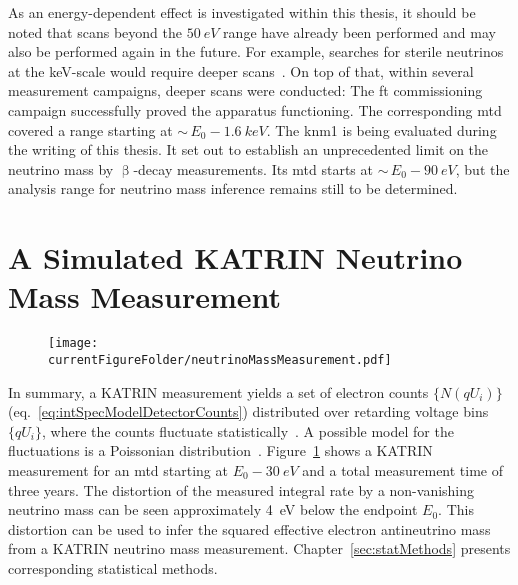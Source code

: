 As an energy-dependent effect is investigated within this thesis, it should be noted that scans beyond the $\SI{50}{eV}$ range have already been performed and may also be performed again in the future. For example, searches for sterile neutrinos at the keV-scale would require deeper scans~\cite{Mertens2019}. On top of that, within several measurement campaigns, deeper scans were conducted: The \gls{ft} commissioning campaign successfully proved the apparatus functioning. The corresponding \gls{mtd} covered a range starting at $\sim\,E_0-\SI{1.6}{keV}$. The \gls{knm1} is being evaluated during the writing of this thesis. It set out to establish an unprecedented limit on the neutrino mass by $\upbeta$-decay measurements. Its \gls{mtd} starts at $\sim\,E_0-\SI{90}{eV}$, but the analysis range for neutrino mass inference remains still to be determined.

\section{A Simulated KATRIN Neutrino Mass Measurement}
\label{sec:intSpecModelNuMassMeasurement}
\begin{figure}
	\centering
	\texttt{[image: \\currentFigureFolder/neutrinoMassMeasurement.pdf]}
	\label{fig:katrinExpNuMassMeasurement}
\end{figure}
In summary, a KATRIN measurement yields a set of electron counts $\{N(qU_i)\}$ (eq.~\ref{eq:intSpecModelDetectorCounts}) distributed over retarding voltage bins $\{qU_i\}$, where the counts fluctuate statistically~\cite{Angrik:2005ep}. A possible model for the fluctuations is a Poissonian distribution~\cite{Kleesiek2014}. Figure~\ref{fig:katrinExpNuMassMeasurement} shows a KATRIN measurement for an \gls{mtd} starting at $E_0-\SI{30}{eV}$ and a total measurement time of three years. The distortion of the measured integral rate by a non-vanishing neutrino mass can be seen approximately \SI{4}{eV} below the endpoint $E_0$. This distortion can be used to infer the squared effective electron antineutrino mass from a KATRIN neutrino mass measurement. Chapter~\ref{sec:statMethods} presents corresponding statistical methods.